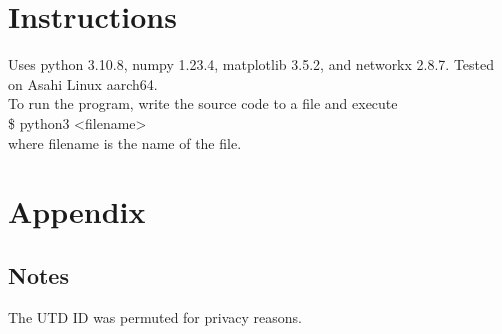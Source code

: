 \documentclass{article}
\begin{document}
\section{Instructions}
Uses python 3.10.8, numpy 1.23.4, matplotlib 3.5.2, and networkx 2.8.7. Tested on Asahi Linux aarch64. \\

To run the program, write the source code to a file and execute \\

\$ python3 \textless filename\textgreater \\

where filename is the name of the file.

\section{Appendix}
\subsection{Notes}
The UTD ID was permuted for privacy reasons.
\end{document}
